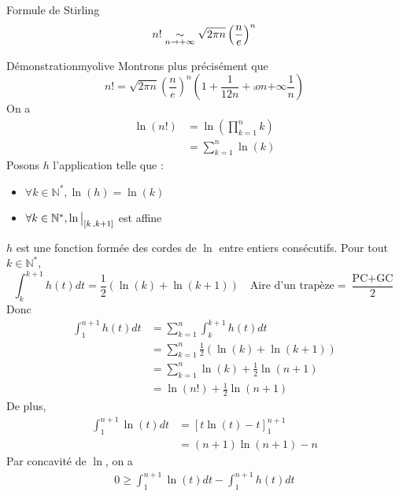         \begin{prop}{Formule de Stirling}{}
            \[ n! \underset{n \rightarrow +\infty}{\sim} \sqrt{2 \pi n} \left( \frac{n}{e} \right)^n \]
        \end{prop}
    
        \begin{demo}{Démonstration}{myolive}
            Montrons plus précisément que 
            \[ n! = \sqrt{2 \pi n} \left( \frac{n}{e} \right)^n \left(1 + \frac{1}{12n} + \comp{o}{n}{+\infty}{\frac{1}{n}}\right) \]
            On a 
            \begin{align*}
                \ln(n!) 
                &= \ln \left(\prod_{k=1}^{n} k\right) \\
                &= \sum_{k=1}^{n} \ln(k)
            \end{align*}
            Posons $h$ l’application telle que : 
            \begin{itemize}
                \item $\forall k \in \mathbb{N}^*, \ln(h) = \ln(k)$
                \item $\forall k \in \mathbb{N}^*, \restr{\ln}{\intervalleFF{k}{k+1}}$ est affine
            \end{itemize}
            $h$ est une fonction formée des cordes de $\ln$ entre entiers consécutifs.
            Pour tout $k \in \mathbb{N}^*$, 
            \[ \int_{k}^{k+1} h(t)dt = \frac{1}{2} \left(\ln(k) + \ln(k+1)\right) \quad \text{Aire d’un trapèze} = \frac{\text{PC} + \text{GC}}{2} \]
            Donc 
            \begin{align*}
                \int_{1}^{n+1} h(t)dt 
                &= \sum_{k=1}^{n} \int_{k}^{k+1} h(t)dt \\
                &= \sum_{k=1}^{n} \frac{1}{2} \left(\ln(k) + \ln(k+1)\right) \\
                &= \sum_{k=1}^{n} \ln(k) + \frac{1}{2} \ln(n+1) \\
                &= \ln(n!) + \frac{1}{2} \ln(n+1)
            \end{align*}
            De plus, 
            \begin{align*}
                \int_{1}^{n+1} \ln(t)dt 
                &= \left[ t\ln(t) - t \right]_1^{n+1} \\
                &= (n+1)\ln(n+1) - n
            \end{align*}
            Par concavité de $\ln$, on a 
            \begin{align*}
                0 \geq \int_{1}^{n+1} \ln(t)dt - \int_{1}^{n+1} h(t)dt

\end{align*}
\end{demo}
